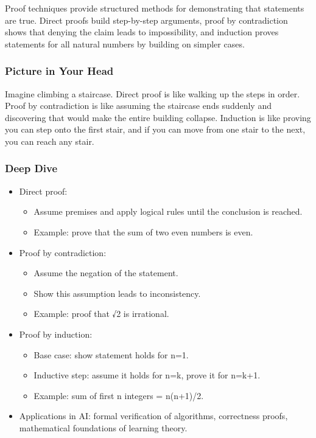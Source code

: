 \documentclass[
  letterpaper,
  DIV=11,
  numbers=noendperiod]{scrreprt}
\providecommand{\tightlist}{%
  \setlength{\itemsep}{0pt}\setlength{\parskip}{0pt}}
\begin{document}
Proof techniques provide structured methods for demonstrating that
statements are true. Direct proofs build step-by-step arguments, proof
by contradiction shows that denying the claim leads to impossibility,
and induction proves statements for all natural numbers by building on
simpler cases.

\subsubsection{Picture in Your Head}\label{picture-in-your-head-185}

Imagine climbing a staircase. Direct proof is like walking up the steps
in order. Proof by contradiction is like assuming the staircase ends
suddenly and discovering that would make the entire building collapse.
Induction is like proving you can step onto the first stair, and if you
can move from one stair to the next, you can reach any stair.

\subsubsection{Deep Dive}\label{deep-dive-185}

\begin{itemize}
\item
  Direct proof:

  \begin{itemize}
  \tightlist
  \item
    Assume premises and apply logical rules until the conclusion is
    reached.
  \item
    Example: prove that the sum of two even numbers is even.
  \end{itemize}
\item
  Proof by contradiction:

  \begin{itemize}
  \tightlist
  \item
    Assume the negation of the statement.
  \item
    Show this assumption leads to inconsistency.
  \item
    Example: proof that √2 is irrational.
  \end{itemize}
\item
  Proof by induction:

  \begin{itemize}
  \tightlist
  \item
    Base case: show statement holds for n=1.
  \item
    Inductive step: assume it holds for n=k, prove it for n=k+1.
  \item
    Example: sum of first n integers = n(n+1)/2.
  \end{itemize}
\item
  Applications in AI: formal verification of algorithms, correctness
  proofs, mathematical foundations of learning theory.
\end{itemize}
\end{document}
